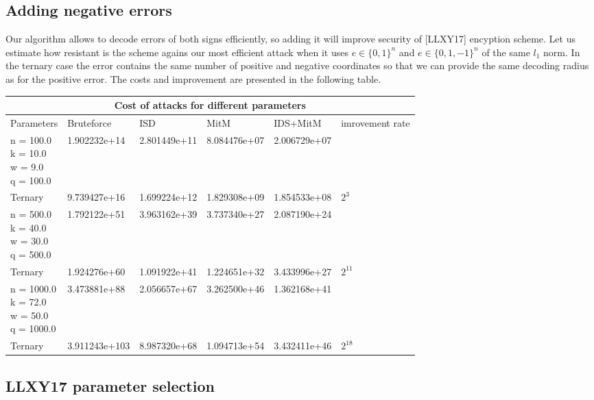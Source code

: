 \documentclass[12pt]{article}
\begin{document}
\subsection{Adding negative errors}
\label{subsec:negative_error_improvement}
Our algorithm allows to decode errors of both signs efficiently, so adding it will improve security of [LLXY17] encyption scheme. Let us estimate how resistant is the scheme agains our most efficient attack when it uses $ e \in \{0,1\}^{n}$ and $ e \in \{0,1,-1\}^{n}$ of the same $l_1$ norm. In the ternary case the error contains the same number of positive and negative coordinates so that we can provide the same decoding radius as for the positive error. The costs and improvement are presented in the following table.\\
\begin{tabular}{ |l||p{}|p{}|p{}|p{}|p{2cm}|  }
 \hline
 \multicolumn{6}{|c|}{Cost of attacks for different parameters} \\
 \hline
 Parameters & Bruteforce & ISD & MitM & IDS+MitM & imrovement rate \\
 \hline
 \makecell{ n = 100.0 \\ k = 10.0 \\ w = 9.0 \\ q = 100.0} & 1.902232e+14 & 2.801449e+11 & 8.084476e+07 & 2.006729e+07 &  \\
 \hline
 Ternary & 9.739427e+16 & 1.699224e+12 & 1.829308e+09 & 1.854533e+08 & $2^{3}$ \\
 \hline
 \makecell{n = 500.0 \\ k = 40.0 \\ w = 30.0 \\ q = 500.0} & 1.792122e+51 &  3.963162e+39 & 3.737340e+27 & 2.087190e+24 &  \\
 \hline
 Ternary & 1.924276e+60 & 1.091922e+41 & 1.224651e+32 & 3.433996e+27 & $2^{11}$\\
 \hline
 \makecell{n = 1000.0 \\ k = 72.0 \\ w = 50.0 \\ q = 1000.0} & 3.473881e+88 & 2.056657e+67 & 3.262500e+46 &  1.362168e+41 &  \\
 \hline
 Ternary & 3.911243e+103 & 8.987320e+68 & 1.094713e+54 & 3.432411e+46 & $2^{18}$ \\
 \hline
\end{tabular}
\subsection{LLXY17 parameter selection}
\label{subsec:param_improvement}
\end{document}
